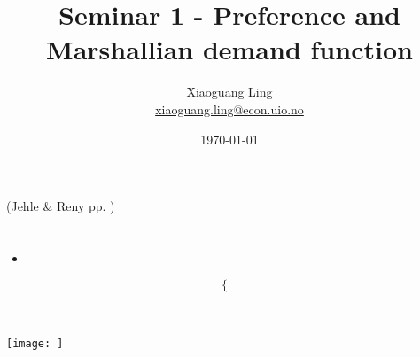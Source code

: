 \documentclass{article}
\title{Seminar 1 - Preference and Marshallian demand function}
\author{Xiaoguang Ling \\  \href{xiaoguang.ling@econ.uio.no}{xiaoguang.ling@econ.uio.no}}
\date{\today}
\begin{document}
\maketitle

(Jehle \& Reny pp. )
\section{}

\begin{mdframed}[backgroundcolor=blue!20,linecolor=white]

\end{mdframed}


\begin{mdframed}[backgroundcolor=yellow!20,linecolor=white]

\end{mdframed}




\begin{itemize}
\item 
\end{itemize}


\begin{equation}
    \begin{cases}

    \end{cases}
    \label{eq:}   
\end{equation}


\begin{align*}


\end{align*}





\subsection{}

{\centering
\texttt{[image: ]}
\label{}}
\vspace{2mm}
\end{document}
